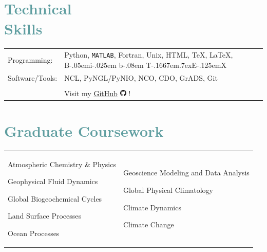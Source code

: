 \documentclass[margin,line,palatino,courier,10pt]{res}
\def\BibTeX{{\rm B\kern-.05em{\sc i\kern-.025em b}\kern-.08em
    T\kern-.1667em\lower.7ex\hbox{E}\kern-.125emX}}
\newenvironment{list1}{
  \begin{list}{\ding{113}}{%
      \setlength{\itemsep}{0in}
      \setlength{\parsep}{0in} \setlength{\parskip}{0in}
      \setlength{\topsep}{0in} \setlength{\partopsep}{0in}
      \setlength{\leftmargin}{0.17in}}}{\end{list}}
\begin{document}
\begin{resume}
\section{\sc \textcolor{CadetBlue}{\large{Technical \\ Skills}}}
\vspace*{0.05in}
\begin{tabular}{@{}p{0.8in}p{6in}}

Programming:& Python, \texttt{MATLAB}, Fortran, Unix, HTML, \TeX, \LaTeX, \BibTeX \\
Software/Tools: & NCL, PyNGL/PyNIO, NCO, CDO, GrADS, Git\\\\

& Visit my \href{https://github.com/zmlabe}{GitHub} \includegraphics[height=9pt]{github.png} !\\
\end{tabular}


\noindent\makebox[\linewidth][r]{\rule{\textwidth}{5pt}}
\vspace{-0.3in}

\section{\sc \textcolor{CadetBlue}{\large{Graduate Coursework}}}

\begin{tabular}{@{}p{2.2in}p{3in}}
\begin{list1}
\item Atmospheric Chemistry \& Physics 
\item Geophysical Fluid Dynamics
\item Global Biogeochemical Cycles
\item Land Surface Processes
\item Ocean Processes
\end{list1}
&
\begin{list1}
\item Geoscience Modeling and Data Analysis
\item Global Physical Climatology
\item Climate Dynamics
\item Climate Change
\end{list1}



\end{tabular}
\end{resume}
\end{document}
